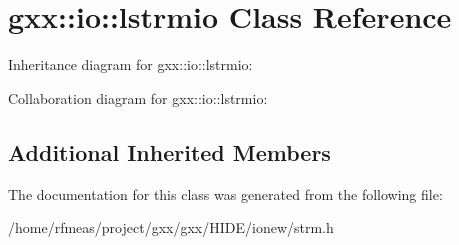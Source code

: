 \hypertarget{classgxx_1_1io_1_1lstrmio}{}\section{gxx\+:\+:io\+:\+:lstrmio Class Reference}
\label{classgxx_1_1io_1_1lstrmio}


Inheritance diagram for gxx\+:\+:io\+:\+:lstrmio\+:


Collaboration diagram for gxx\+:\+:io\+:\+:lstrmio\+:
\subsection*{Additional Inherited Members}


The documentation for this class was generated from the following file\+:\begin{DoxyCompactItemize}
\item 
/home/rfmeas/project/gxx/gxx/\+H\+I\+D\+E/ionew/strm.\+h\end{DoxyCompactItemize}
